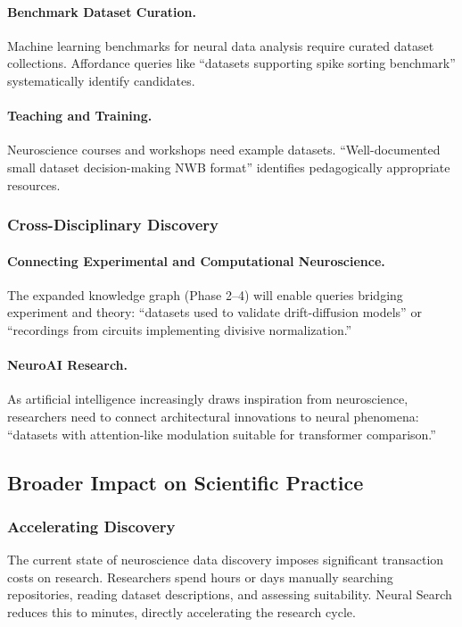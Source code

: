 \documentclass{article}
\theoremstyle{definition}
\begin{document}
\paragraph{Benchmark Dataset Curation.} Machine learning benchmarks for neural data analysis require curated dataset collections. Affordance queries like ``datasets supporting spike sorting benchmark'' systematically identify candidates.

\paragraph{Teaching and Training.} Neuroscience courses and workshops need example datasets. ``Well-documented small dataset decision-making NWB format'' identifies pedagogically appropriate resources.

\subsubsection{Cross-Disciplinary Discovery}

\paragraph{Connecting Experimental and Computational Neuroscience.} The expanded knowledge graph (Phase 2--4) will enable queries bridging experiment and theory: ``datasets used to validate drift-diffusion models'' or ``recordings from circuits implementing divisive normalization.''

\paragraph{NeuroAI Research.} As artificial intelligence increasingly draws inspiration from neuroscience, researchers need to connect architectural innovations to neural phenomena: ``datasets with attention-like modulation suitable for transformer comparison.''

\subsection{Broader Impact on Scientific Practice}

\subsubsection{Accelerating Discovery}

The current state of neuroscience data discovery imposes significant transaction costs on research. Researchers spend hours or days manually searching repositories, reading dataset descriptions, and assessing suitability. Neural Search reduces this to minutes, directly accelerating the research cycle.
\end{document}

